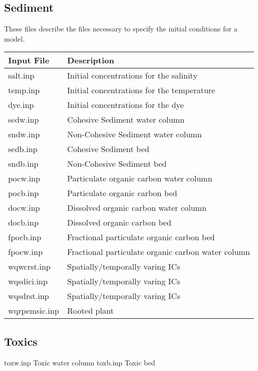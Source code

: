 \documentclass[letterpaper,10pt,english]{sphinxmanual}
\begin{document}
\subsection{Sediment}
\label{\detokenize{inputfiles/sediment:sediment}}\label{\detokenize{inputfiles/sediment:id1}}\label{\detokenize{inputfiles/sediment::doc}}
These files describe the files necessary to specify the initial conditions for a model.


\begin{savenotes}\sphinxattablestart
\centering
\begin{tabulary}{\linewidth}[t]{|T|T|}
\hline
\sphinxstyletheadfamily 
Input File
&\sphinxstyletheadfamily 
Description
\\
\hline
salt.inp
&
Initial concentrations for the salinity
\\
\hline
temp.inp
&
Initial concentrations for the temperature
\\
\hline
dye.inp
&
Initial concentrations for the dye
\\
\hline
sedw.inp
&
Cohesive Sediment water column
\\
\hline
sndw.inp
&
Non-Cohesive Sediment water column
\\
\hline
sedb.inp
&
Cohesive Sediment bed
\\
\hline
sndb.inp
&
Non-Cohesive Sediment bed
\\
\hline
pocw.inp
&
Particulate organic carbon water column
\\
\hline
pocb.inp
&
Particulate organic carbon bed
\\
\hline
docw.inp
&
Dissolved organic carbon water column
\\
\hline
docb.inp
&
Dissolved organic carbon bed
\\
\hline
fpocb.inp
&
Fractional particulate organic carbon bed
\\
\hline
fpocw.inp
&
Fractional particulate organic carbon water column
\\
\hline
wqwcrst.inp
&
Spatially/temporally varing ICs
\\
\hline
wqsdici.inp
&
Spatially/temporally varing ICs
\\
\hline
wqsdrst.inp
&
Spatially/temporally varing ICs
\\
\hline
wqrpemsic.inp
&
Rooted plant
\\
\hline
\end{tabulary}
\par
\sphinxattableend\end{savenotes}


\subsection{Toxics}
\label{\detokenize{inputfiles/toxics:toxics}}\label{\detokenize{inputfiles/toxics:id1}}\label{\detokenize{inputfiles/toxics::doc}}
toxw.inp      Toxic water column
toxb.inp      Toxic bed
\end{document}
